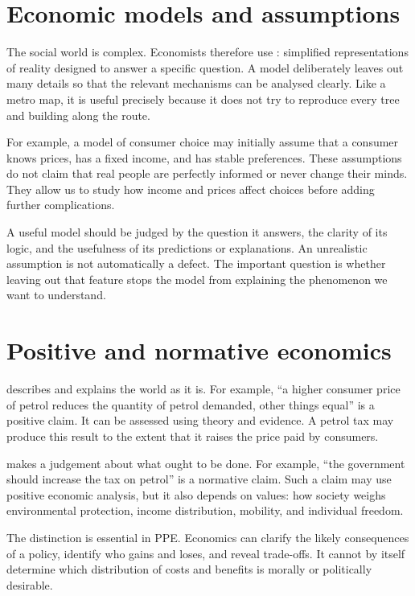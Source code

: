 \section{Economic models and assumptions}

The social world is complex. Economists therefore use :
simplified representations of reality designed to answer a specific question.
A model deliberately leaves out many details so that the relevant mechanisms
can be analysed clearly. Like a metro map, it is useful precisely because it
does not try to reproduce every tree and building along the route.

For example, a model of consumer choice may initially assume that a consumer knows prices, has a fixed income, and has stable preferences. These assumptions do not claim that real people are perfectly informed or never change their minds. They allow us to study how income and prices affect choices before adding further complications.

A useful model should be judged by the question it answers, the clarity of its
logic, and the usefulness of its predictions or explanations. An unrealistic
assumption is not automatically a defect. The important question is whether
leaving out that feature stops the model from explaining the phenomenon we
want to understand.

\section{Positive and normative economics}

 describes and explains the world as it is. For example, ``a higher consumer price of petrol reduces the quantity of petrol demanded, other things equal'' is a positive claim. It can be assessed using theory and evidence. A petrol tax may produce this result to the extent that it raises the price paid by consumers.

 makes a judgement about what ought to be done. For example, ``the government should increase the tax on petrol'' is a normative claim. Such a claim may use positive economic analysis, but it also depends on values: how society weighs environmental protection, income distribution, mobility, and individual freedom.

The distinction is essential in PPE. Economics can clarify the likely consequences of a policy, identify who gains and loses, and reveal trade-offs. It cannot by itself determine which distribution of costs and benefits is morally or politically desirable.

